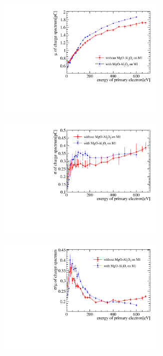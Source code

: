 \begin{figure}[!ht]
	\centering
	\begin{subfigure}[b]{0.5\textwidth}
		\centering
		\includegraphics[width=0.9\textwidth]{PMTRelated/GTmodel/gain_mu.pdf}
		\caption{}
		\label{fig:gain}
	\end{subfigure}%
	\begin{subfigure}[b]{0.5\textwidth}
		\centering
		\includegraphics[width=0.9\textwidth]{PMTRelated/GTmodel/gain_sigma.pdf}
		\caption{}
		\label{fig:sigma}
	\end{subfigure}
	\hfill
	\begin{subfigure}[b]{0.5\textwidth}
		\centering
		\includegraphics[width=0.9\textwidth]{PMTRelated/GTmodel/gain_sigmamu.pdf}

\end{subfigure}
\end{figure}
